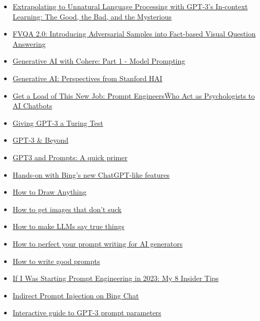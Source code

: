 \begin{itemize}
  \item \href{http://ai.stanford.edu/blog/in-context-learning}{Extrapolating to Unnatural Language Processing with GPT-3's In-context Learning: The Good, the Bad, and the Mysterious}
  \item \href{https://arxiv.org/pdf/2303.10699.pdf}{FVQA 2.0: Introducing Adversarial Samples into Fact-based Visual Question Answering}
  \item \href{https://txt.cohere.ai/generative-ai-part-1}{Generative AI with Cohere: Part 1 - Model Prompting}
  \item \href{https://hai.stanford.edu/sites/default/files/2023-03/Generative_AI_HAI_Perspectives.pdf}{Generative AI: Perspectives from Stanford HAI}
  \item \href{https://futurism.com/prompt-engineers-ai}{Get a Load of This New Job: \"Prompt Engineers\" Who Act as Psychologists to AI Chatbots}
  \item \href{https://lacker.io/ai/2020/07/06/giving-gpt-3-a-turing-test.html}{Giving GPT-3 a Turing Test}
  \item \href{https://youtube.com/watch?v=-lnHHWRCDGk}{GPT-3 \& Beyond}
  \item \href{https://buildspace.so/notes/intro-to-gpt3-prompts}{GPT3 and Prompts: A quick primer}
  \item \href{https://techcrunch.com/2023/02/08/hands-on-with-the-new-bing/}{Hands-on with Bing’s new ChatGPT-like features}
  \item \href{https://andys.page/posts/how-to-draw}{How to Draw Anything}
  \item \href{https://www.reddit.com/r/StableDiffusion/comments/x41n87/how_to_get_images_that_dont_suck_a}{How to get images that don't suck}
  \item \href{https://evanjconrad.com/posts/world-models}{How to make LLMs say true things}
  \item \href{https://www.sydney.edu.au/news-opinion/news/2023/02/28/how-to-perfect-your-prompt-writing-for-ai-generators.html}{How to perfect your prompt writing for AI generators}
  \item \href{https://andymatuschak.org/prompts}{How to write good prompts}
  \item \href{https://youtube.com/watch?v=SirW7feTjh0&feature=shares}{If I Was Starting Prompt Engineering in 2023: My 8 Insider Tips}
  \item \href{https://greshake.github.io/}{Indirect Prompt Injection on Bing Chat}
  \item \href{https://sevazhidkov.com/interactive-guide-to-gpt-3-prompt-parameters}{Interactive guide to GPT-3 prompt parameters}

\end{itemize}
